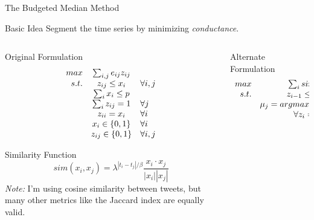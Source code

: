 \documentclass[compress]{beamer}
\begin{document}
\begin{frame}{The Budgeted Median Method}

\begin{block}{Basic Idea}
Segment the time series by minimizing \textit{conductance}.
\end{block}

\begin{columns}[t]
\begin{column}[1]{3.5cm}
\begin{overprint}
\begin{center}{
Original Formulation
\[
\begin{array}{r c l }
max & \sum_{i,j} e_{ij}z_{ij} & \\
s.t. & z_{ij} \leq x_i & \forall i,j \\
& \sum_i x_i \leq p & \\
& \sum_i z_{ij} = 1 & \forall j \\
& z_{ii} = x_i & \forall i \\
& x_i \in \{0,1\} & \forall i \\
& z_{ij} \in \{0,1\} & \forall i,j \\
\end{array}
\]
}\end{center}
\begin{center}{
Similarity Function
\[
sim(x_i, x_j) = \lambda^{|t_i - t_j|/\beta} \frac{x_i \cdot x_j}{|x_i||x_j|}
\]
{\tiny
\textit{Note:} I'm using cosine similarity between tweets, but many other
metrics like the Jaccard index are equally valid.
}
}\end{center}
\end{overprint}
\end{column}

\begin{column}[2]{5cm}
\begin{center}
Alternate Formulation
\[
\begin{array}{r c l }
max & \sum_i sim(x_i, \mu_{z_i}) & \\
s.t. & z_{i-1} \leq z_i \leq z_{i+1} & \\
& \mu_j = argmax_{x_i} \sum_{k} sim(x_i, x_k) & \\
& \forall z_i = z_k = j & \\
\end{array}
\]
\end{center}
\end{column}
\end{columns}

\end{frame}
\end{document}
